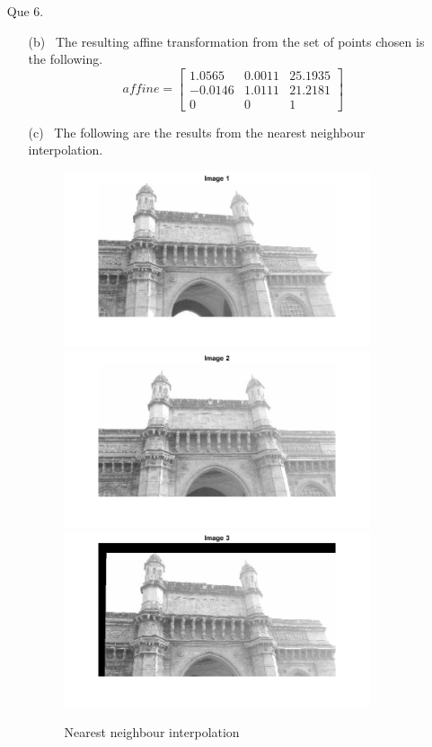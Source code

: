 \documentclass[11pt]{article}
\begin{document}
\maketitle
\begin{enumerate}
\item[Que 6.]
\begin{enumerate}

\item[(b)] \
The resulting affine transformation from the set of points chosen is the following.
\begin{equation}
    \textit{affine}=\begin{bmatrix}
        1.0565 & 0.0011 & 25.1935\\
-0.0146 & 1.0111 & 21.2181\\
0 & 0 & 1
    \end{bmatrix}
\end{equation}
\item[(c)] \
The following are the results from the nearest neighbour interpolation.
\begin{figure}[!htb]
\centering
{}
  \includegraphics[width=9cm]{images/Im1.jpg}
  \endminipage\hfill
 \includegraphics[width=9cm]{images/Im2.jpg}
    \endminipage\hfill
  \minipage{0.5\textwidth}
  \includegraphics[width=9cm]{images/nearest.jpg}
  \endminipage\hfill
\caption{Nearest neighbour interpolation}
\end{figure}


\end{enumerate}
\end{enumerate}
\end{document}

